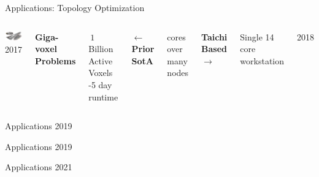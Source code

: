 \placelogofalse
\begin{frame}{Applications: Topology Optimization}
\begin{columns}

  \vspace{0.5cm}
  \includegraphics[width=3.0cm]{giga_opt_diagram.png}\\
  2017 \cite{Aage2017}

  \centering
  \textbf{Giga-voxel Problems}
  \begin{outline}
  \1 $~1$ Billion Active Voxels
  -5 day runtime
  \end{outline}
  \vspace{0.5cm}
  \textbf{$\leftarrow$ Prior SotA}
  \begin{outline}
   cores over many nodes
  \end{outline}
  \vspace{0.5cm}
  \textbf{Taichi Based $\rightarrow$}
  \begin{outline}
  \1 Single 14 core workstation  
  \end{outline}

  \vspace{0.5cm}
  2018 \cite{Liu2018}

\end{columns}
\end{frame}
\placelogotrue

\begin{frame}{Applications}
  2019 \cite{Hu2019chainqueen}
\end{frame}

\begin{frame}{Applications}
  2019 \cite{Spielberg2019}
\end{frame}

\begin{frame}{Applications}
  2021 \cite{Hu2021}
\end{frame}
